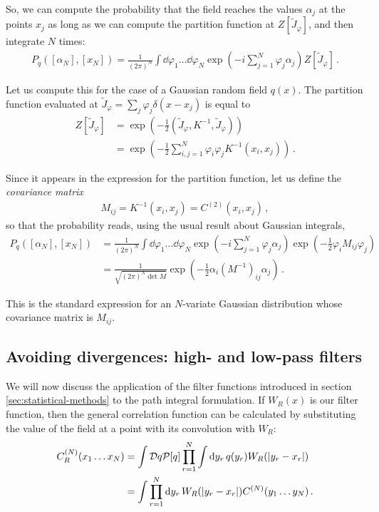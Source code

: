\documentclass[main.tex]{subfiles}
\begin{document}
So, we can compute the probability that the field reaches the values \(\alpha _j\) at the points \(x_j\) as long as we can compute the partition function at \(Z[\widetilde{J}_\varphi ]\), and then integrate \(N\) times: 
%
\begin{align}
P_q ([\alpha _N], [x_N]) = \frac{1}{(2 \pi)^{N}} 
\int \dd{\varphi_1 } \dots \dd{\varphi _N }
\exp(-i \sum _{j=1}^{N} \varphi _j \alpha_j )
Z[\widetilde{J}_\varphi ]
\,.
\end{align}

Let us compute this for the case of a Gaussian random field \(q(x)\). The partition function evaluated at \(\widetilde{J}_\varphi = \sum _{j} \varphi _j \delta (x- x_j)\) is equal to 
%
\begin{align}
Z[\widetilde{J}_\varphi ] &= \exp( - \frac{1}{2} (\widetilde{J}_\varphi , K^{-1}, \widetilde{J}_\varphi )) \\
&= \exp( - \frac{1}{2} \sum _{i, j =1}^{N} \varphi _i \varphi _j K^{-1} (x_i, x_j))
\,.
\end{align}

Since it appears in the expression for the partition function, let us define the \emph{covariance matrix}
%
\begin{align}
M_{ij} = K^{-1}(x_i, x_j) = C^{(2)} (x_i, x_j)
\,,
\end{align}
%
so that the probability reads, using the usual result about Gaussian integrals,
%
\begin{align}
P_q ([\alpha _N], [x_N]) &= \frac{1}{(2 \pi)^{N}} 
\int \dd{\varphi_1 } \dots \dd{\varphi _N }
\exp(-i \sum _{j=1}^{N} \varphi _j \alpha_j )
\exp(- \frac{1}{2} \varphi_i M_{ij } \varphi _j)  \\
&= \frac{1}{\sqrt{(2 \pi)^{N} \det M}}
\exp(- \frac{1}{2} \alpha _i (M^{-1})_{ij} \alpha _j)
\,.
\end{align}

This is the standard expression for an \(N\)-variate Gaussian distribution whose covariance matrix is \(M_{ij}\). 


\subsection{Avoiding divergences: high- and low-pass filters}

We will now discuss the application of the filter functions introduced in section \ref{sec:statistical-methods} to the path integral formulation. 
If \(W_R (x)\) is our filter function, then the general correlation function can be calculated by substituting the value of the field at a point with its convolution with \(W_R\):
%
\begin{align}
C^{(N)}_R (x_1 \dots x_N) &= \int \mathcal{D}q \mathcal{P}[q] \prod_{r = 1}^{N}
\int \dd{y_r} q(y_r) W_R (\abs{y_r - x_r})  \\
&= \int \prod_{r=1}^{N} \dd{y_r} W_R(\abs{y_r - x_r}) C^{(N)} (y_1 \dots y_N)
\,.
\end{align}
\end{document}
